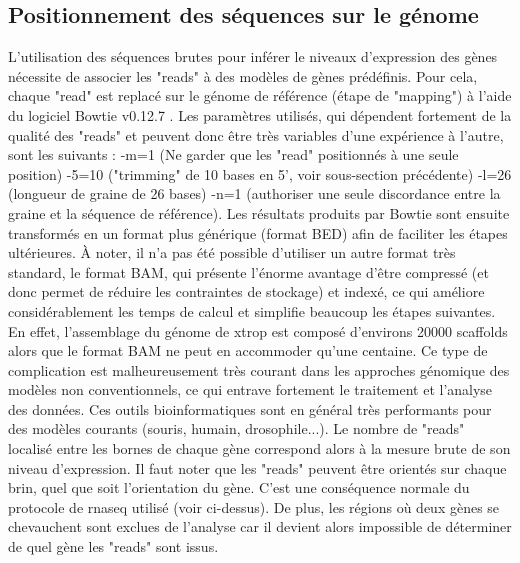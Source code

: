 \documentclass[../main.tex]{subfiles}
\begin{document}
\subsection{Positionnement des séquences sur le génome}
L'utilisation des séquences brutes pour inférer le niveaux d'expression des gènes nécessite de associer les "reads" à des modèles de gènes prédéfinis.
Pour cela, chaque "read" est replacé sur le génome de référence (étape de "mapping") à l'aide du logiciel Bowtie v0.12.7 \citep{Langmead2009}. Les paramètres utilisés, qui dépendent fortement de la qualité des "reads" et peuvent donc être très variables d'une expérience à l'autre, sont les suivants : -m=1 (Ne garder que les "read" positionnés à une seule position) -5=10 ("trimming" de 10 bases en 5', voir sous-section précédente) -l=26 (longueur de graine de 26 bases) -n=1 (authoriser une seule discordance entre la graine et la séquence de référence).
Les résultats produits par Bowtie sont ensuite transformés en un format plus générique (format BED) afin de faciliter les étapes ultérieures.
À noter, il n'a pas été possible d'utiliser un autre format très standard, le format BAM, qui présente l'énorme avantage d'être compressé (et donc permet de réduire les contraintes de stockage) et indexé, ce qui améliore considérablement les temps de calcul et simplifie beaucoup les étapes suivantes.
En effet, l'assemblage du génome de \gls{xtrop} est composé d'environs 20000 scaffolds alors que le format BAM ne peut en accommoder qu'une centaine.
Ce type de complication est malheureusement très courant dans les approches génomique des modèles non conventionnels, ce qui entrave fortement le traitement et l'analyse des données.
Ces outils bioinformatiques sont en général très performants pour des modèles courants (souris, humain, drosophile...).
Le nombre de "reads" localisé entre les bornes de chaque gène correspond alors à la mesure brute de son niveau d'expression. 
Il faut noter que les "reads" peuvent être orientés sur chaque brin, quel que soit l'orientation du gène.
C'est une conséquence normale du protocole de \gls{rnaseq} utilisé (voir ci-dessus).
De plus, les régions où deux gènes se chevauchent sont exclues de l'analyse car il devient alors impossible de déterminer de quel gène les "reads" sont issus.
\end{document}
